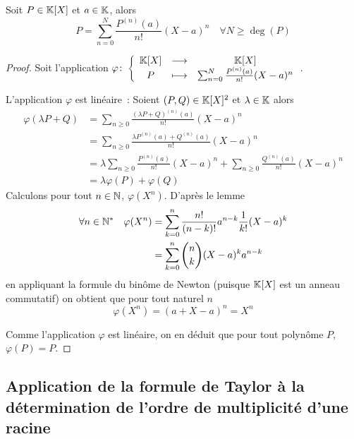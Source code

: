 \begin{theo}
  Soit \(P \in \mathbb{K}[X]\) et \(a \in \mathbb{K}\), alors
  \begin{equation}
    P = \sum_{n = 0}^N \frac{P^{(n)}(a)}{n!} (X-a)^n \quad \forall N \geqslant
    \deg(P)
  \end{equation}
\end{theo}
\begin{proof}
  Soit l'application \(\varphi\colon\left\{\begin{array}{ccc}\mathbb{K}[X] & \longrightarrow &\mathbb{K}[X]\\P & \longmapsto & \sum_{n = 0}^N
  \frac{P^{(n)}(a)}{n!} (X-a)^n\end{array}\right.\).

  L'application \(\varphi\) est linéaire~: Soient \((P,Q) \in \mathbb{K}[X]^2\) et
  \(\lambda \in \mathbb{K}\) alors
  \begin{align}
    \varphi(\lambda P +Q) &= \sum_{n \geqslant 0} \frac{(\lambda
    P+Q)^{(n)}(a)}{n!}(X-a)^n\\
    &= \sum_{n \geqslant 0} \frac{\lambda P^{(n)}(a) +Q^{(n)}(a)}{n!}(X-a)^n\\
    &= \lambda \sum_{n \geqslant 0} \frac{P^{(n)}(a)}{n!}(X-a)^n + \sum_{n
    \geqslant 0} \frac{Q^{(n)}(a)}{n!}(X-a)^n \\
    &= \lambda\varphi(P) +\varphi(Q)
  \end{align}
  Calculons pour tout \(n \in \mathbb{N}\), \(\varphi(X^n)\). D'après le lemme
  \begin{align}
    \forall n \in \mathbb{N}^* \quad \varphi(X^n) &= \sum_{k = 0}^n \frac{n!}{(n-k)!}
    a^{n-k} \frac{1}{k!}(X-a)^k\\
    &= \sum_{k = 0}^n \binom{n}{k} (X-a)^k a^{n-k}
  \end{align}
  en appliquant la formule du binôme de Newton (puisque \(\mathbb{K}[X]\) est un anneau
  commutatif) on obtient que pour tout naturel \(n\)
  \begin{equation}
    \varphi(X^n) = (a+X-a)^n = X^n
  \end{equation}

  Comme l'application \(\varphi\) est linéaire, on en déduit que pour tout
  polynôme \(P\), \(\varphi(P) = P\).
\end{proof}

\subsection{Application de la formule de Taylor à la détermination de l'ordre de
multiplicité  d'une racine}

